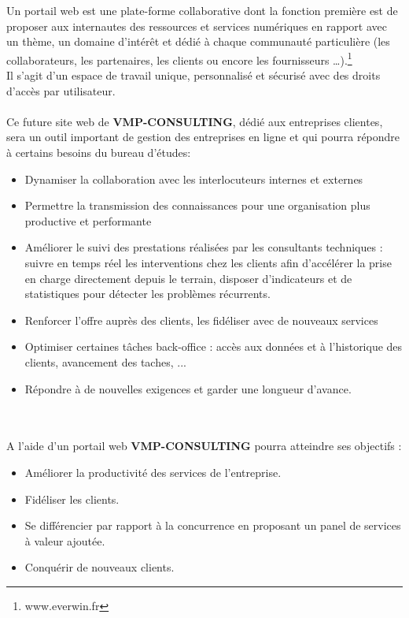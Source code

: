 \documentclass[12pt]{article}
\begin{document}
Un portail web est une plate-forme collaborative dont la fonction première est de proposer aux internautes des ressources et services numériques en rapport avec un thème, un domaine d’intérêt et dédié à chaque communauté particulière (les collaborateurs, les partenaires, les clients ou encore les fournisseurs …).\footnote{www.everwin.fr}  \\
Il s’agit d’un espace de travail unique, personnalisé et sécurisé avec des droits d’accès par utilisateur.\\ \\


Ce future site web de \textbf{VMP-CONSULTING}, dédié aux entreprises clientes, sera un outil important
 de gestion des entreprises en ligne et qui pourra répondre à certains besoins du bureau d'études:
\begin{itemize}

\item  Dynamiser la collaboration avec les interlocuteurs internes et externes
 \item   Permettre la transmission des connaissances pour une organisation plus productive et performante
 \item     Améliorer le suivi des prestations réalisées par les consultants techniques : suivre en temps réel les interventions chez les clients afin d’accélérer la prise en charge directement depuis le terrain, disposer d’indicateurs et de statistiques pour détecter les problèmes récurrents.
 
 \item   Renforcer  l'offre auprès des clients, les fidéliser avec de nouveaux services
 \item   Optimiser certaines tâches back-office : accès aux données et à l’historique des  clients, avancement des taches, ...
\item    Répondre à de nouvelles exigences et garder une longueur d’avance.

\end{itemize}

\\ \\

A l'aide d'un portail web  \textbf{VMP-CONSULTING} pourra atteindre ses objectifs :

\begin{itemize}

\item Améliorer la productivité des services de l'entreprise.
\item Fidéliser les clients.
\item Se différencier par rapport à la concurrence en proposant un panel de services à
valeur ajoutée.
\item Conquérir de nouveaux clients.
\end{itemize}
\end{document}

